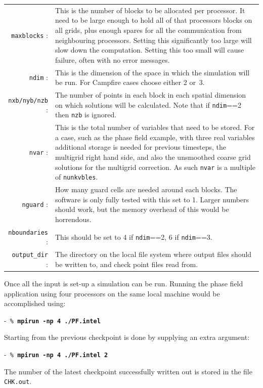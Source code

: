 \documentclass[paper=a4, fontsize=11pt,twoside,bibtotoc]{scrartcl}		%
\newenvironment{codebox}{\begin{center}\begin{MakeFramed}{\hsize0.99\linewidth\advance\hsize-\width\FrameRestore}\tt}{\end{MakeFramed}\end{center}}
\newcommand{\prompt}[1]{\textsl{\%} \textbf{#1}}
\begin{document}
\begin{tabular}{rp{}}
	\texttt{maxblocks} :&{This is the number of blocks to be allocated per processor.  It need to be large enough to hold all of that processors blocks on all 
				grids, plus enough spares for all the communication from neighbouring processors.  Setting this significantly too large will 
slow down the computation.  Setting this too small will cause failure, often with no error messages.}\\
	\texttt{ndim} :&{This is the dimension of the space in which the simulation will be run.  For Campfire cases choose either 2 or~3.}\\
	\texttt{nxb/nyb/nzb} :&{The number of points in each block in each spatial dimension on which solutions will be calculated.  Note that if 
				\texttt{ndim}==2 then \texttt{nzb} is ignored.}\\
	\texttt{nvar} :&{This is the total number of variables that need to be stored.  For a case, such as the phase field example, with three real variables 
				additional storage is needed for previous timesteps, the multigrid right hand side, and also the unsmoothed coarse grid solutions 
				for the multigrid correction.  As such \texttt{nvar} is a multiple of \texttt{nunkvbles}.}\\
	\texttt{nguard} :&{How many guard cells are needed around each blocks.  The software is only fully tested with this set to 1.  Larger numbers should 
				work, but the memory overhead of this would be horrendous.}\\
	\texttt{nboundaries} :&{This should be set to 4 if \texttt{ndim}==2, 6 if \texttt{ndim}==3.}\\
	\texttt{output\_dir} :&{The directory on the local file system where output files should be written to, and check point files read from.}\\
\end{tabular}


Once all the input is set-up a simulation can be run.  Running the phase field application using four processors on the same local machine would be accomplished 
using:
\begin{codebox}
	\prompt{mpirun -np 4 ./PF.intel}
\end{codebox}

\noindent
Starting from the previous checkpoint is done by supplying an extra argument:
\begin{codebox}
	\prompt{mpirun -np 4 ./PF.intel 2}
\end{codebox}
The number of the latest checkpoint successfully written out is stored in the file \texttt{CHK.out}.
\end{document}
